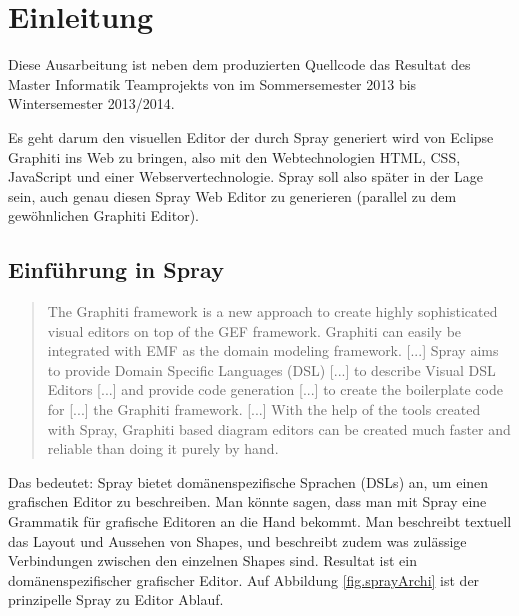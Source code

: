\section{Einleitung}

Diese Ausarbeitung ist neben dem produzierten Quellcode das Resultat des
Master Informatik Teamprojekts von \autor im Sommersemester 2013 bis
Wintersemester 2013/2014.

Es geht darum den visuellen Editor der durch Spray generiert wird
von Eclipse Graphiti ins Web zu bringen, also mit den Webtechnologien
HTML, CSS, JavaScript und einer Webservertechnologie.
Spray soll also später in der Lage sein, auch genau diesen Spray
Web Editor zu generieren (parallel zu dem gewöhnlichen Graphiti Editor).


\subsection{Einführung in Spray}

\begin{quote}
The Graphiti framework is a new approach to create highly sophisticated
visual editors on top of the GEF framework.
Graphiti can easily be integrated with EMF as the
domain modeling framework. [...]
Spray aims to provide Domain Specific Languages (DSL) [...]
to describe Visual DSL Editors [...]
and provide code generation [...] to create the boilerplate code
for [...] the Graphiti framework. [...]
With the help of the tools created with Spray,
Graphiti based diagram editors can be created much faster
and reliable than doing it purely by hand. \citep{sprayWebpage}
\end{quote}

\noindent Das bedeutet: Spray bietet domänenspezifische Sprachen (DSLs) an,
um einen grafischen Editor zu beschreiben. Man könnte sagen, dass
man mit Spray eine Grammatik für grafische Editoren an die Hand bekommt.
Man beschreibt textuell das Layout und Aussehen von Shapes, und beschreibt
zudem was zulässige Verbindungen zwischen den einzelnen Shapes sind.
Resultat ist ein domänenspezifischer grafischer Editor.
Auf Abbildung \ref{fig.sprayArchi} ist der prinzipelle Spray zu Editor Ablauf. 

